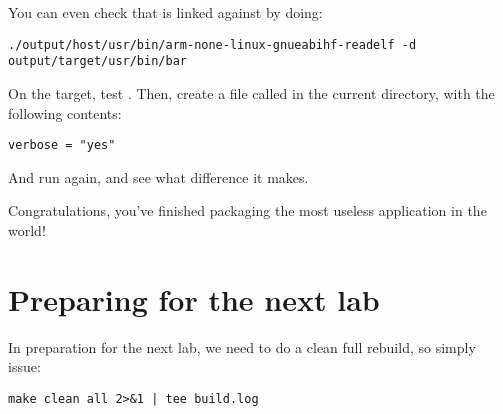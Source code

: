 You can even check that  is linked against
 by doing:

\begin{verbatim}
./output/host/usr/bin/arm-none-linux-gnueabihf-readelf -d output/target/usr/bin/bar
\end{verbatim}

On the target, test . Then, create a file called
 in the current directory, with the following contents:

\begin{verbatim}
verbose = "yes"
\end{verbatim}

And run  again, and see what difference it makes.

Congratulations, you've finished packaging the most useless application
in the world!

\section{Preparing for the next lab}

In preparation for the next lab, we need to do a clean full rebuild,
so simply issue:

\begin{verbatim}
make clean all 2>&1 | tee build.log
\end{verbatim}

